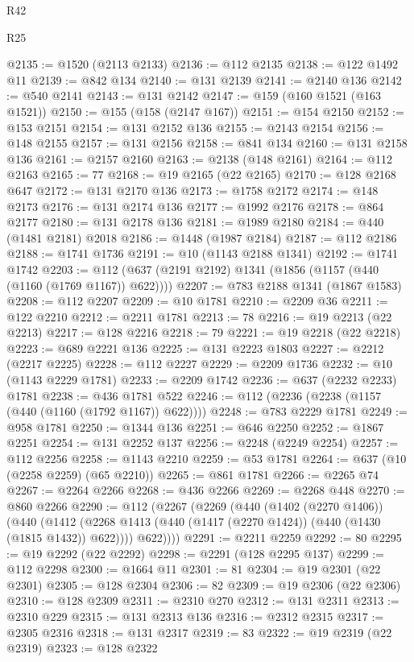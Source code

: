 \begin{lexlean}{R42}
\begin{lexlean}{R25}
\begin{coremodule}
{{{{{{{{{{{{{{{{{{{{{{{{{{{{{{{{{{{{{{{{{{{{{{{{{{{{{{{{{{{{{{{{{{{{{{{{{{{{{{{{{{{{{{{{{{{{{{{{{{{{{{{{{{{{{{{{{{{{{{{{{{{{{{{{{{{{{{{{{{{{{{{{{{{{{{{{{{{{{{{{{{{{{{{{{{{{{{{{{{{{{{{{{{{{{{{{{{{{{{{@2135 := @1520 (@2113 @2133)
@2136 := @112 @2135
@2138 := @122 @1492 @11
@2139 := @842 @134
@2140 := @131 @2139
@2141 := @2140 @136
@2142 := @540 @2141
@2143 := @131 @2142
@2147 := @159 (@160 @1521 (@163 @1521))
@2150 := @155 (@158 (@2147 @167))
@2151 := @154 @2150
@2152 := @153 @2151
@2154 := @131 @2152 @136
@2155 := @2143 @2154
@2156 := @148 @2155
@2157 := @131 @2156
@2158 := @841 @134
@2160 := @131 @2158 @136
@2161 := @2157 @2160
@2163 := @2138 (@148 @2161)
@2164 := @112 @2163
@2165 := 77
@2168 := @19 @2165 (@22 @2165)
@2170 := @128 @2168 @647
@2172 := @131 @2170 @136
@2173 := @1758 @2172
@2174 := @148 @2173
@2176 := @131 @2174 @136
@2177 := @1992 @2176
@2178 := @864 @2177
@2180 := @131 @2178 @136
@2181 := @1989 @2180
@2184 := @440 (@1481 @2181) @2018
@2186 := @1448 (@1987 @2184)
@2187 := @112 @2186
@2188 := @1741 @1736
@2191 := @10 (@1143 @2188 @1341)
@2192 := @1741 @1742
@2203 := @112 (@637 (@2191 @2192) @1341 (@1856 (@1157 (@440 (@1160 (@1769 @1167)) @622))))
@2207 := @783 @2188 @1341 (@1867 @1583)
@2208 := @112 @2207
@2209 := @10 @1781
@2210 := @2209 @36
@2211 := @122 @2210
@2212 := @2211 @1781
@2213 := 78
@2216 := @19 @2213 (@22 @2213)
@2217 := @128 @2216
@2218 := 79
@2221 := @19 @2218 (@22 @2218)
@2223 := @689 @2221 @136
@2225 := @131 @2223 @1803
@2227 := @2212 (@2217 @2225)
@2228 := @112 @2227
@2229 := @2209 @1736
@2232 := @10 (@1143 @2229 @1781)
@2233 := @2209 @1742
@2236 := @637 (@2232 @2233) @1781
@2238 := @436 @1781 @522
@2246 := @112 (@2236 (@2238 (@1157 (@440 (@1160 (@1792 @1167)) @622))))
@2248 := @783 @2229 @1781
@2249 := @958 @1781
@2250 := @1344 @136
@2251 := @646 @2250
@2252 := @1867 @2251
@2254 := @131 @2252 @137
@2256 := @2248 (@2249 @2254)
@2257 := @112 @2256
@2258 := @1143 @2210
@2259 := @53 @1781
@2264 := @637 (@10 (@2258 @2259) (@65 @2210))
@2265 := @861 @1781
@2266 := @2265 @74
@2267 := @2264 @2266
@2268 := @436 @2266
@2269 := @2268 @448
@2270 := @860 @2266
@2290 := @112
    (@2267
      (@2269
        (@440
          (@1402 (@2270 @1406))
          (@440
            (@1412 (@2268 @1413 (@440 (@1417 (@2270 @1424)) (@440 (@1430 (@1815 @1432)) @622))))
            @622))))
@2291 := @2211 @2259
@2292 := 80
@2295 := @19 @2292 (@22 @2292)
@2298 := @2291 (@128 @2295 @137)
@2299 := @112 @2298
@2300 := @1664 @11
@2301 := 81
@2304 := @19 @2301 (@22 @2301)
@2305 := @128 @2304
@2306 := 82
@2309 := @19 @2306 (@22 @2306)
@2310 := @128 @2309
@2311 := @2310 @270
@2312 := @131 @2311
@2313 := @2310 @229
@2315 := @131 @2313 @136
@2316 := @2312 @2315
@2317 := @2305 @2316
@2318 := @131 @2317
@2319 := 83
@2322 := @19 @2319 (@22 @2319)
@2323 := @128 @2322
}}}}}}}}}}}}}}}}}}}}}}}}}}}}}}}}}}}}}}}}}}}}}}}}}}}}}}}}}}}}}}}}}}}}}}}}}}}}}}}}}}}}}}}}}}}}}}}}}}}}}}}}}}}}}}}}}}}}}}}}}}}}}}}}}}}}}}}}}}}}}}}}}}}}}}}}}}}}}}}}}}}}}}}}}}}}}}}}}}}}}}}}}}}}}}}}}}}}}}}
\end{coremodule}
\end{lexlean}
\end{lexlean}
